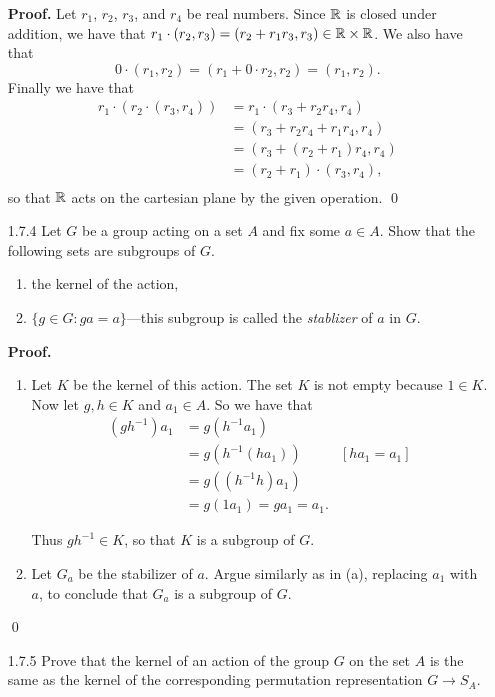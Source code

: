 \begin{enumerate}
      \textbf{Proof.} Let $r_1$, $r_2$, $r_3$, and $r_4$ be real numbers. Since
      $\mathbb{R}$ is closed under addition, we have that
      $r_1 \cdot (r_2, r_3) = (r_2 + r_1r_3, r_3) \in \mathbb{R} \times \mathbb{R}$. We also
      have that
      $$0 \cdot (r_1, r_2) = (r_1 + 0 \cdot r_2, r_2) = (r_1, r_2).$$
      Finally we have that
      \begin{align*}
         r_1 \cdot (r_2 \cdot (r_3, r_4)) &= r_1 \cdot (r_3 + r_2r_4, r_4) \\
            &= (r_3 + r_2r_4 + r_1r_4, r_4) \\
            &= (r_3 + (r_2 + r_1)r_4, r_4) \\
            &= (r_2 + r_1) \cdot (r_3, r_4), \\
      \end{align*}
      so that $\mathbb{R}$ acts on the cartesian plane by the given operation. \qed
   \item[1.7.4]   Let $G$ be a group acting on a set $A$ and fix some $a \in A$.
                  Show that the following sets are subgroups of $G$.
                  \begin{enumerate}
                     \item the kernel of the action,
                     \item $\{g \in G : ga = a\}$---this subgroup is called the
                           \textit{stablizer} of $a$ in $G$.
                  \end{enumerate}

      \textbf{Proof.}

      \begin{enumerate}
         \item Let $K$ be the kernel of this action. The set $K$ is not empty
               because $1 \in K$. Now let $g, h \in K$ and $a_1 \in A$. So we
               have that
               \begin{align*}
                  (gh^{-1})a_1 &= g(h^{-1}a_1) \\
                     &= g(h^{-1}(ha_1)) &[ha_1 = a_1] \\
                     &= g((h^{-1}h)a_1) \\
                     & = g(1a_1) = ga_1 = a_1.
               \end{align*}

               Thus $gh^{-1} \in K$, so that $K$ is a subgroup of $G$.

         \item Let $G_a$ be the stabilizer of $a$. Argue similarly as in (a),
               replacing $a_1$ with $a$, to conclude that $G_a$ is a subgroup of
               $G$.
      \end{enumerate}  \qed
   \item[1.7.5]   Prove that the kernel of an action of the group $G$ on the set
                  $A$ is the same as the kernel of the corresponding permutation
                  representation $G \rightarrow S_A$.


\end{enumerate}

